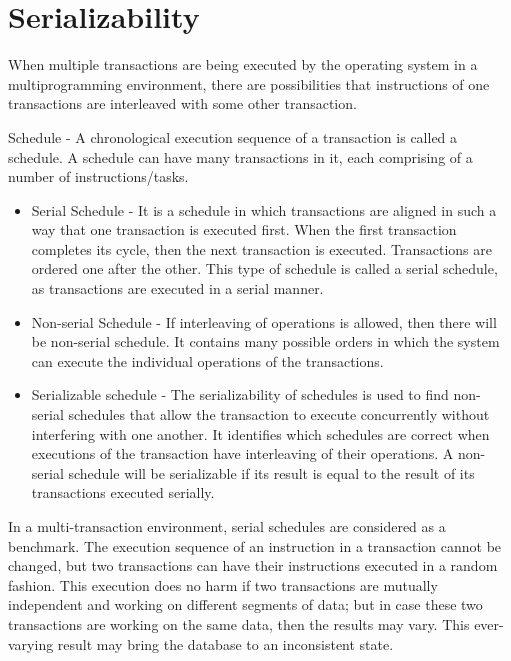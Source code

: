 \documentclass{article}
\begin{document}
\section{Serializability}

When multiple transactions are being executed by the operating system in a multiprogramming environment, there are possibilities that instructions of one transactions are interleaved with some other transaction.

Schedule - A chronological execution sequence of a transaction is called a schedule. A schedule can have many transactions in it, each comprising of a number of instructions/tasks.

\begin{itemize}

\item Serial Schedule - It is a schedule in which transactions are aligned in such a way that one transaction is executed first. When the first transaction completes its cycle, then the next transaction is executed. Transactions are ordered one after the other. This type of schedule is called a serial schedule, as transactions are executed in a serial manner.

\item Non-serial Schedule - If interleaving of operations is allowed, then there will be non-serial schedule. It contains many possible orders in which the system can execute the individual operations of the transactions.


\item Serializable schedule - The serializability of schedules is used to find non-serial schedules that allow the transaction to execute concurrently without interfering with one another. It identifies which schedules are correct when executions of the transaction have interleaving of their operations. A non-serial schedule will be serializable if its result is equal to the result of its transactions executed serially.

\end{itemize}

In a multi-transaction environment, serial schedules are considered as a benchmark. The execution sequence of an instruction in a transaction cannot be changed, but two transactions can have their instructions executed in a random fashion. This execution does no harm if two transactions are mutually independent and working on different segments of data; but in case these two transactions are working on the same data, then the results may vary. This ever-varying result may bring the database to an inconsistent state.
\end{document}
